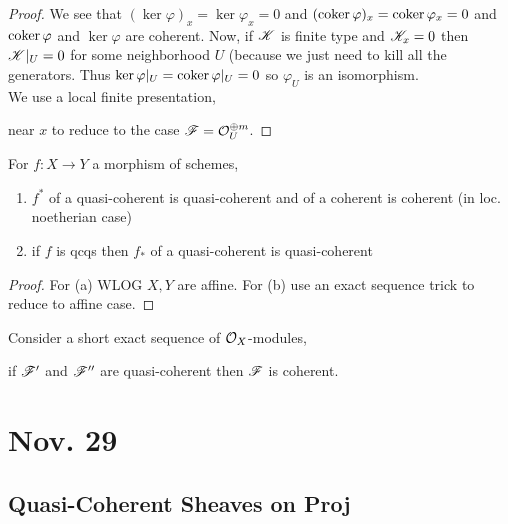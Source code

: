 \documentclass[12pt]{article}
\begin{document}
\begin{proof}
We see that $(\ker{\varphi})_x = \ker{\varphi_x} = 0$ and $(\operatorname{\mathrm{coker}}{\varphi})_x = \operatorname{\mathrm{coker}}{\varphi_x} = 0$ and $\operatorname{\mathrm{coker}}{\varphi}$ and  $\ker{\varphi}$ are coherent. Now, if $\mathscr{K}$ is finite type and $\mathscr{K}_x = 0$ then $\mathscr{K}|_U = 0$ for some neighborhood $U$ (because we just need to kill all the generators. Thus $\ker{\varphi|_U} = \operatorname{\mathrm{coker}}{\varphi|_U} = 0$ so $\varphi_U$ is an isomorphism.
\bigskip\\
We use a local finite presentation,
\begin{center}
\end{center}
near $x$ to reduce to the case $\mathscr{F} = \mathcal{O}_{U}^{\oplus m}$. 
\end{proof}

\begin{thm}
For $f : X \to Y$ a morphism of schemes,
\begin{enumerate}
\item $f^*$ of a quasi-coherent is quasi-coherent and of a coherent is coherent (in loc. noetherian case)
\item if $f$ is qcqs then $f_*$ of a quasi-coherent is quasi-coherent
\end{enumerate}
\end{thm}

\begin{proof}
For (a) WLOG $X, Y$ are affine. For (b) use an exact sequence trick to reduce to affine case.
\end{proof}

\begin{prop}
Consider a short exact sequence of $\mathcal{O}_{X}$-modules,
\begin{center}
\end{center}
if $\mathscr{F}'$ and $\mathscr{F}''$ are quasi-coherent then $\mathscr{F}$ is coherent.
\end{prop}

\section{Nov. 29}

\subsection{Quasi-Coherent Sheaves on Proj}
\end{document}
